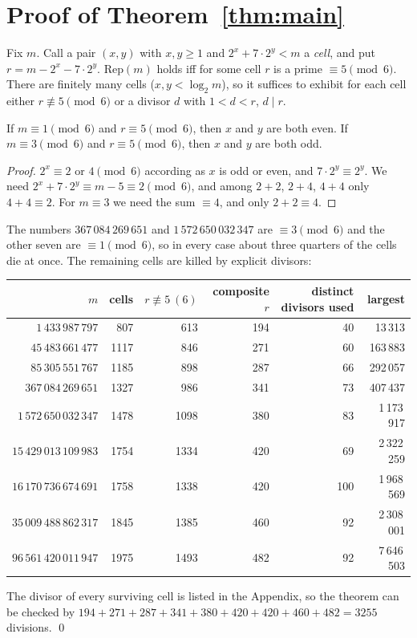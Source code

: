 \documentclass[11pt,a4paper]{article}
\theoremstyle{definition}\newtheorem{definition}[theorem]{Definition}
\theoremstyle{remark}\newtheorem{remark}[theorem]{Remark}
\newcommand{\Rep}{\mathrm{Rep}}
\begin{document}
\section{Proof of Theorem~\ref{thm:main}}
Fix $m$. Call a pair $(x,y)$ with $x,y\ge1$ and $2^x+7\cdot2^y<m$ a \emph{cell}, and put $r=m-2^x-7\cdot 2^y$.
$\Rep(m)$ holds iff for some cell $r$ is a prime $\equiv5\pmod 6$. There are finitely many cells
($x,y<\log_2 m$), so it suffices to exhibit for each cell either $r\not\equiv 5\pmod 6$ or a divisor $d$ with $1<d<r$,
$d\mid r$.

\begin{lemma}\label{lem}
If $m\equiv 1\pmod 6$ and $r\equiv 5\pmod 6$, then $x$ and $y$ are both even. If $m\equiv 3\pmod 6$ and $r\equiv 5\pmod 6$, then $x$ and $y$ are both odd.
\end{lemma}
\begin{proof}
$2^x\equiv 2$ or $4\pmod 6$ according as $x$ is odd or even, and $7\cdot2^y\equiv 2^y$. We need
$2^x+7\cdot 2^y\equiv m-5\equiv 2\pmod 6$, and among $2+2$, $2+4$, $4+4$ only $4+4\equiv 2$.
For $m\equiv 3$ we need the sum $\equiv 4$, and only $2+2\equiv 4$.
\end{proof}
The numbers $367\,084\,269\,651$ and $1\,572\,650\,032\,347$ are $\equiv 3\pmod 6$ and the other seven are $\equiv1\pmod 6$, so in every case about three
quarters of the cells die at once. The remaining cells are killed by explicit divisors:
\begin{center}\begin{tabular}{rrrrrr}\toprule
$m$ & cells & $r\not\equiv5\ (6)$ & composite $r$ & distinct divisors used & largest\\\midrule
$1\,433\,987\,797$ & 807 & 613 & 194 & 40 & 13\,313\\
$45\,483\,661\,477$ & 1117 & 846 & 271 & 60 & 163\,883\\
$85\,305\,551\,767$ & 1185 & 898 & 287 & 66 & 292\,057\\
$367\,084\,269\,651$ & 1327 & 986 & 341 & 73 & 407\,437\\
$1\,572\,650\,032\,347$ & 1478 & 1098 & 380 & 83 & 1\,173\,917\\
$15\,429\,013\,109\,983$ & 1754 & 1334 & 420 & 69 & 2\,322\,259\\
$16\,170\,736\,674\,691$ & 1758 & 1338 & 420 & 100 & 1\,968\,569\\
$35\,009\,488\,862\,317$ & 1845 & 1385 & 460 & 92 & 2\,308\,001\\
$96\,561\,420\,011\,947$ & 1975 & 1493 & 482 & 92 & 7\,646\,503\\\bottomrule\end{tabular}\end{center}
The divisor of every surviving cell is listed in the Appendix, so the theorem can be checked by
$194+271+287+341+380+420+420+460+482=3255$ divisions. \qed
\end{document}
